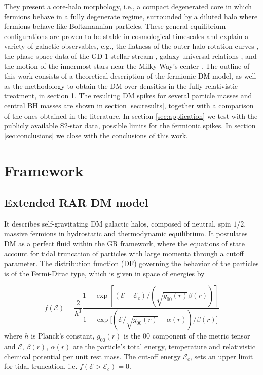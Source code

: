 \documentclass[baaa]{baaa}
\begin{document}
They present a core-halo morphology, i.e., a compact degenerated core in which fermions behave in a fully degenerate regime, surrounded by a diluted halo where fermions behave like Boltzmannian particles. 
These general equilibrium configurations are proven to be stable in cosmological timescales \citep{2021MNRAS.502.4227A} and explain a variety of galactic observables, e.g., the flatness of the outer halo rotation curves \citep{2018PDU....21...82A,2023ApJ...945....1K}, the phase-space data of the GD-1 stellar stream \cite{2024arXiv240419102M}, galaxy universal relations \citep{2019PDU....24..278A,2023ApJ...945....1K}, and the motion of the innermost stars near the Milky Way's center \citep{2020A&A...641A..34B,2021MNRAS.505L..64B,2022MNRAS.511L..35A}. 
The outline of this work consists of a theoretical description of the fermionic DM model, as well as the methodology to obtain the DM over-densities in the fully relativistic treatment, in section \ref{sec:the method}.
The resulting DM spikes for several particle masses and central BH masses are shown in section \ref{sec:results}, together with a comparison of the ones obtained in the literature. In section \ref{sec:application} we test with the publicly available S2-star data, possible limits for the fermionic spikes. In section \ref{sec:conclusions} we close with the conclusions of this work.

\section{Framework}\label{sec:the method}

\subsection{Extended RAR DM model}\label{subse:RAR}

It describes self-gravitating DM galactic halos, composed of neutral, spin $1/2$, massive fermions in hydrostatic and thermodynamic equilibrium. It postulates DM as a perfect fluid within the GR framework, where the equations of state account for tidal truncation of particles with large momenta through a cutoff parameter. The distribution function (DF) governing the behavior of the particles is of the  Fermi-Dirac type, which is given in space of energies by 

\begin{equation}\label{eq:DF}
    f(\mathcal{E}) =\frac{2}{h^3}
        \frac{1-\exp{[(\mathcal{E} - \mathcal{E}_c)/(\sqrt{g_{00}(r)}\beta(r))]}}{1+\exp{[(\mathcal{E}/\sqrt{g_{00}(r)} - \alpha(r))/\beta(r)}]}
\end{equation}
%
where $h$ is Planck's constant, $g_{00}(r)$ is the $00$ component of the metric tensor and $\mathcal{E}$, $\beta(r)$, $\alpha(r)$ are the particle's total energy, temperature and relativistic chemical potential per unit rest mass.
The cut-off energy $\mathcal{E}_c$, sets an upper limit for tidal truncation, i.e. $f(\mathcal{E}>\mathcal{E}_c)=0$. 
\end{document}
